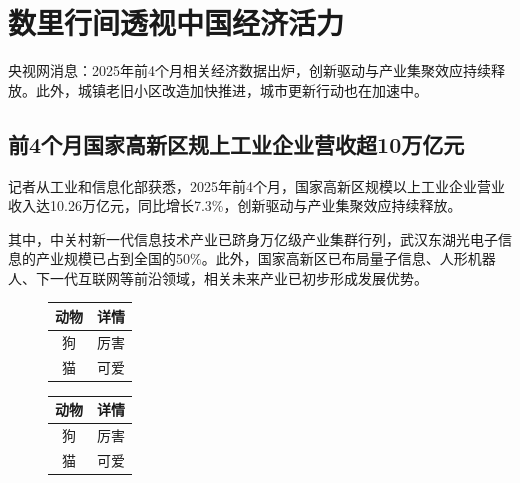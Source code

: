 \section{数里行间透视中国经济活力}
央视网消息：2025年前4个月相关经济数据出炉，创新驱动与产业集聚效应持续释放。此外，城镇老旧小区改造加快推进，城市更新行动也在加速中。\cite{tong1999}

\subsection{前4个月国家高新区规上工业企业营收超10万亿元}
记者从工业和信息化部获悉，2025年前4个月，国家高新区规模以上工业企业营业收入达10.26万亿元，同比增长7.3\%，创新驱动与产业集聚效应持续释放。\cite{riley1990}

其中，中关村新一代信息技术产业已跻身万亿级产业集群行列\cite{cctvnews}，武汉东湖光电子信息的产业规模已占到全国的50\%。此外，国家高新区已布局量子信息、人形机器人、下一代互联网等前沿领域，相关未来产业已初步形成发展优势。\cite{han1996}

\begin{figure}[htbp!]
	\centering
	\begin{minipage}[b]{.5\textwidth}
		\centering
		\label{tab:t2} %
		\begin{tabular}{cp{6cm}}
			\toprule
			动物 & 详情 \\
			\midrule
			狗    & 厉害 \\
			\addlinespace
			猫    & 可爱\\
			\bottomrule
		\end{tabular}
	\end{minipage}
	\qquad
	\begin{minipage}[b]{.3\textwidth}
		\centering
		
		\label{tab:t3} %
		\begin{tabular}{cc}
			\toprule
			动物 & 详情 \\
			\midrule
			狗    & 厉害 \\
			\addlinespace
			猫    & 可爱\\
			\bottomrule
		\end{tabular}
	\end{minipage}
\end{figure}

